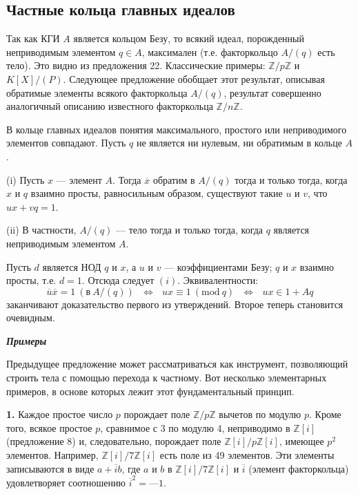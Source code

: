 \subsection{Частные кольца главных идеалов}
Так как КГИ $A$ является кольцом Безу, то всякий идеал,  
порожденный неприводимым элементом $q \in A$, максимален (т.е. факторкольцо 
$A\slash(q)$ есть тело). Это видно из предложения 22. Классические примеры: 
$\mathbb{Z}\slash p\mathbb{Z}$ и $K[X]\slash(P)$. Следующее предложение обобщает этот результат, 
описывая обратимые элементы всякого факторкольца $A\slash(q)$, результат 
совершенно аналогичный описанию известного факторкольца $\mathbb{Z}\slash n\mathbb{Z}$. 
\begin{predl}

\hspace*{15pt}В кольце главных идеалов понятия максимального, простого или 
неприводимого элементов совпадают. Пусть $q$ не является ни нулевым, 
ни обратимым в кольце $A$. 

(i) Пусть $x$ — элемент $A$. Тогда $\overline{x}$ обратим в $A\slash(q)$ тогда и только 
тогда, когда $x$ и $q$ взаимно просты, равносильным образом, существуют 
такие $u$ и $v$, что $ux + vq = 1$. 

(ii) В частности, $A\slash(q)$ — тело тогда и только тогда, когда $q$  
является неприводимым элементом $A$. 
\end{predl}
\begin{myproof}
Пусть $d$ является НОД $q$ и $x$, а $u$ и $v$ — коэффициентами Безу; $q$ и $x$ 
взаимно просты, т.е. $d = 1$. Отсюда следует $(i)$. Эквивалентности: 
\begin{equation*}
\overline{u}\overline{x} = 1\: (\text{в}\: A\slash (q))\:\:\: \Leftrightarrow\:\:\: ux \equiv 1\: (\text{mod}\:q)\:\:\: \Leftrightarrow \:\:\: ux \in 1 + Aq
\end{equation*}
заканчивают доказательство первого из утверждений. Второе теперь
 становится очевидным. 
\end{myproof}

\noindent\textbf{\textit{Примеры}}

Предыдущее предложение может рассматриваться как инструмент, 
позволяющий строить тела с помощью перехода к частному. Вот  
несколько элементарных примеров, в основе которых лежит этот  
фундаментальный принцип. 
\newpage

\textbf{1.} Каждое простое число $p$ порождает поле $\mathbb{Z}\slash p\mathbb{Z}$ вычетов по  
модулю $p$. Кроме того, всякое простое $p$, сравнимое с 3 по модулю 4, 
неприводимо в $\mathbb{Z}[i]$ (предложение 8) и, следовательно, порождает поле 
$\mathbb{Z}[i]\slash p\mathbb{Z}[i]$, имеющее $p^2$ элементов. Например, $\mathbb{Z}[i]\slash 7\mathbb{Z}[i]$ есть поле из 49 
элементов. Эти элементы записываются в виде $a+\overline{i}b$, где $a$ и $b$ в $\mathbb{Z}[i]\slash 7\mathbb{Z}[i]$
и $\overline{i}$ (элемент факторкольца) удовлетворяет соотношению $\overline{i}^2 = — 1.$

